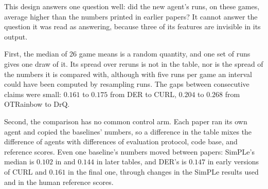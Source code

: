 \begin{refsection}
\begin{experiment}
\end{experiment}

This design answers one question well: did the new agent's runs, on these games, average higher than the numbers printed in earlier papers? It cannot answer the question it was read as answering, because three of its features are invisible in its output.

First, the median of 26 game means is a random quantity, and one set of runs gives one draw of it. Its spread over reruns is not in the table, nor is the spread of the numbers it is compared with, although with five runs per game an interval could have been computed by resampling runs. The gaps between consecutive claims were small: $0.161$ to $0.175$ from DER to CURL, $0.204$ to $0.268$ from OTRainbow to DrQ.

Second, the comparison has no common control arm. Each paper ran its own agent and copied the baselines' numbers, so a difference in the table mixes the difference of agents with differences of evaluation protocol, code base, and reference scores. Even one baseline's numbers moved between papers: SimPLe's median is $0.102$ in \textcite{Kielak2020} and $0.144$ in later tables, and DER's is $0.147$ in early versions of CURL and $0.161$ in the final one, through changes in the SimPLe results used and in the human reference scores.


\end{refsection}
